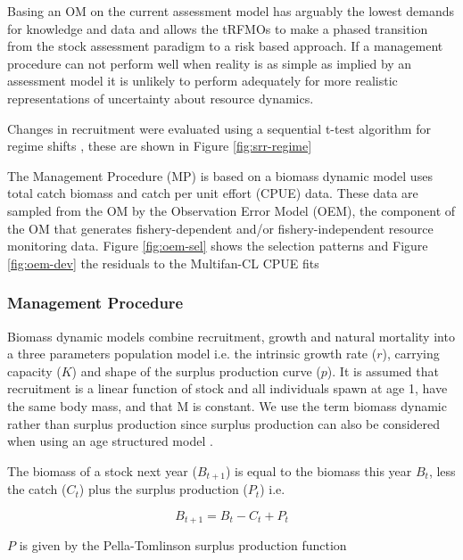 \documentclass[%
nonumbib,      %
%
]{nrc1}                          %
\begin{document}
Basing an OM on the current assessment model has arguably the lowest demands for knowledge and data and allows the tRFMOs to make a phased transition from the stock assessment paradigm to a risk based approach. If a management procedure can not perform well when reality is as simple as implied by an assessment model it is unlikely to perform adequately for more realistic representations of uncertainty about resource dynamics. 


Changes in recruitment were evaluated using a sequential t-test algorithm for regime shifts \citep{rodionov2004sequential}, these are shown in Figure \ref{fig:srr-regime} 
 

The Management Procedure (MP) is based on a biomass dynamic model uses total catch biomass and catch per unit effort (CPUE) data. These data are sampled from the OM by the Observation Error Model (OEM),  the component of the OM that generates fishery-dependent and/or fishery-independent resource monitoring data. Figure \ref{fig:oem-sel} shows the selection patterns and Figure \ref{fig:oem-dev} the residuals to the Multifan-CL CPUE fits 
     
     
\subsubsection*{Management Procedure}

Biomass dynamic models combine recruitment, growth and natural mortality into a three parameters population model i.e.  the intrinsic growth rate ($r$), carrying capacity ($K$) and shape of the surplus production curve ($p$).  It is assumed that recruitment is a linear function of stock and all individuals spawn at age 1, have the same body mass, and that M is constant. We use the term biomass dynamic rather than surplus production since surplus production can also be considered when using an age structured model \citep{hilborn_quantitative_1992}. 

The biomass of a stock next year ($B_{t+1}$) is equal to the biomass this year $B_{t}$, less the catch ($C_t$) plus the surplus production ($P_t$) i.e. 

\begin{equation}  B_{t+1}=B_{t}-C_{t}+P_{t}\end{equation}  

$P$ is given by the Pella-Tomlinson surplus production function \citep{pella1969generalized}
\end{document}
